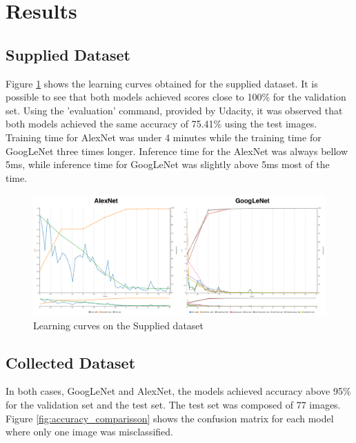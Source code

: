 \documentclass[10pt,journal,compsoc]{IEEEtran}
\begin{document}
\section{Results}

\subsection{Supplied Dataset}

Figure \ref{fig:learning_curves} shows the learning curves obtained for the supplied dataset. It is possible to see that both models achieved scores close to 100\% for the validation set.
Using the 'evaluation' command, provided by Udacity, it was observed that both models achieved the same accuracy of 75.41\% using the test images. Training time for AlexNet was under 4 minutes while the training time for GoogLeNet three times longer. Inference time for the AlexNet was always bellow 5ms, while inference time for GoogLeNet was slightly above 5ms most of the time. 

\begin{figure}[thpb]
      \centering
      \includegraphics[width=\linewidth]{p_learning_curves.png}
      \caption{Learning curves on the Supplied dataset}
      \label{fig:learning_curves}
\end{figure}

\subsection{Collected Dataset}

In both cases, GoogLeNet and AlexNet, the models achieved accuracy above 95\% for the validation set and the test set. 
The test set was composed of 77 images. Figure \ref{fig:accuracy_comparisson} shows the confusion matrix for each model where only one image was misclassified.
\end{document}
